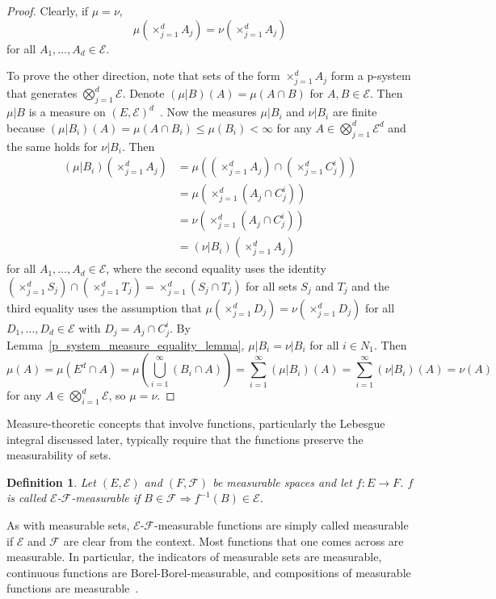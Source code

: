\documentclass[english,twoside,openright]{HYgraduMLDS}
\newtheorem{definition}[lemma]{Definition}
\DeclareMathOperator*{\bigtimes}{\times}
\begin{document}
\begin{proof}
	Clearly, if \(\mu = \nu\),
  \[
    \mu\left(\bigtimes_{j=1}^{d}A_{j}\right)
    = \nu\left(\bigtimes_{j=1}^{d}A_{j}\right)
  \]
  for all \(A_{1},\dotsc, A_{d} \in \mathcal{E}\).

  To prove the other direction, note that sets of the form
  \(\bigtimes_{j=1}^{d}A_{j}\) form a p-system that generates
  \(\bigotimes_{j=1}^{d}\mathcal{E}\). Denote \((\mu| B)(A) =\mu(A\cap B)\)
  for \(A, B\in \mathcal{E}\).
  Then \(\mu| B\) is a measure on \((E, \mathcal{E})^{d}\)~\cite{Cin11}.
  Now the measures \(\mu|B_{i}\) and \(\nu|B_{i}\) are finite because
  \((\mu|B_{i})(A) = \mu(A\cap B_{i}) \leq \mu(B_{i}) < \infty\) for any
  \(A\in \bigotimes_{j=1}^{d}\mathcal{E}^{d}\) and the same holds for \(\nu|B_{i}\).
  Then
  \begin{align*}
    (\mu|B_{i})\left(\bigtimes_{j=1}^{d}A_{j}\right)
    &= \mu\left(\left(\bigtimes_{j=1}^{d}A_{j}\right)
      \cap \left(\bigtimes_{j=1}^{d}C_{j}^{i}\right)\right)
    \\&= \mu\left(\bigtimes_{j=1}^{d}(A_{j} \cap C_{j}^{i})\right)
    \\&= \nu\left(\bigtimes_{j=1}^{d}(A_{j} \cap C_{j}^{i})\right)
    \\&= (\nu|B_{i})\left(\bigtimes_{j=1}^{d}A_{j}\right)
  \end{align*}
  for all \(A_{1}, \dotsc, A_{d}\in \mathcal{E}\), where the second equality
  uses the identity
  \(\left(\bigtimes_{j=1}^{d}S_{j}\right)
  \cap\left(\bigtimes_{j=1}^{d} T_{j}\right)
  = \bigtimes_{j=1}^{d}(S_{j}\cap T_{j})\)
  for all sets \(S_{j}\) and \(T_{j}\)
  and the third equality uses the assumption that
  \(\mu\left(\bigtimes_{j=1}^{d}D_{j}\right)
  = \nu\left(\bigtimes_{j=1}^{d} D_{j}\right)\)
  for all \(D_{1},\dotsc,D_{d}\in \mathcal{E}\) with
  \(D_{j} = A_{j}\cap C_{j}^{i}\).
  By Lemma~\ref{p_system_measure_equality_lemma},
  \(\mu|B_{i} = \nu|B_{i}\) for all \(i\in N_{1}\). Then
  \[
    \mu(A) = \mu(E^{d}\cap A)
    = \mu\left(\bigcup_{i=1}^{\infty}(B_{i}\cap A)\right)
    = \sum_{i=1}^{\infty}(\mu|B_{i})(A)
    = \sum_{i=1}^{\infty}(\nu|B_{i})(A)
    = \nu(A)
  \]
  for any \(A\in \bigotimes_{i=1}^{d}\mathcal{E}\), so \(\mu = \nu\).
\end{proof}

Measure-theoretic concepts that involve functions, particularly the
Lebesgue integral discussed later, typically require that the functions
preserve the measurability of sets.
\begin{definition}
	Let \((E, \mathcal{E})\) and \((F, \mathcal{F})\) be measurable spaces
  and let \(f\colon E\to F\). \(f\) is called
  \(\mathcal{E}\)-\(\mathcal{F}\)-measurable if
  \(B\in \mathcal{F}\Rightarrow f^{-1}(B)\in \mathcal{E}\).
\end{definition}
As with measurable sets, \(\mathcal{E}\)-\(\mathcal{F}\)-measurable functions
are simply called measurable if \(\mathcal{E}\) and \(\mathcal{F}\) are
clear from the context.
Most functions that one comes across are measurable. In particular,
the indicators of measurable sets are measurable, continuous functions
are Borel-Borel-measurable, and compositions of measurable functions
are measurable~\cite{Cin11}.
\end{document}
